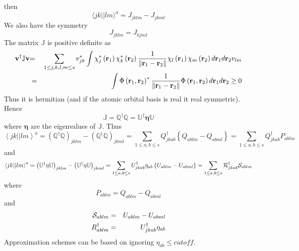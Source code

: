 \documentclass[aps,preprint]{revtex4}
\begin{document}
then 
\begin{equation}
\langle jk||lm\rangle ^{a}=J_{jklm}-J_{jkml}
\end{equation}%
We also have the symmetry 
\begin{equation}
J_{jklm}=J_{kjml}
\end{equation}%
The matrix $\mathbb{J}$ is positive definite as 
\begin{eqnarray}
\mathbf{v}^{\dagger }\mathbb{J}\mathbf{v} &\mathbf{=}&\sum_{1\leq
j,k,l,m\leq s}v_{jk}^{\ast }\int \chi _{j}^{\ast }\left( \mathbf{r}%
_{1}\right) \chi _{k}^{\ast }\left( \mathbf{r}_{2}\right) \frac{1}{\left\| 
\mathbf{r}_{1}-\mathbf{r}_{2}\right\| }\chi _{l}\left( \mathbf{r}_{1}\right)
\chi _{m}\left( \mathbf{r}_{2}\right) d\mathbf{r}_{1}d\mathbf{r}_{2}v_{lm} 
\notag \\
&=&\int \Phi \left( \mathbf{r}_{1},\mathbf{r}_{2}\right) ^{\ast }\frac{1}{%
\left\| \mathbf{r}_{1}-\mathbf{r}_{2}\right\| }\Phi \left( \mathbf{r}_{1},%
\mathbf{r}_{2}\right) d\mathbf{r}_{1}d\mathbf{r}_{2}\geq 0
\end{eqnarray}%
Thus it is hermitian (and if the atomic orbital basis is real it real
symmetric). Hence 
\begin{equation}
\mathbb{J=Q}^{\dagger }\mathbb{Q=U}^{\dagger }\mathbf{\eta }\mathbb{U}
\end{equation}%
where $\mathbf{\eta }$ are the eigenvalues of $\mathbb{J}$. Thus 
\begin{equation}
\left\langle jk||lm\right\rangle ^{a}=\left( \mathbb{Q}^{\dagger }\mathbb{Q}%
\right) _{jklm}-\left( \mathbb{Q}^{\dagger }\mathbb{Q}\right)
_{jkml}=\sum_{1\leq a,b\leq s}Q_{jkab}^{\dagger }\left\{
Q_{ablm}-Q_{abml}\right\} =\sum_{1\leq a,b\leq s}Q_{jkab}^{\dagger }P_{ablm}
\end{equation}%
and 
\begin{equation}
\left\langle jk||lm\right\rangle ^{a}=\left( \mathbb{U}^{\dagger }\mathbf{%
\eta }\mathbb{U}\right) _{jklm}-\left( \mathbb{U}^{\dagger }\mathbf{\eta }%
\mathbb{U}\right) _{jkml}=\sum_{1\leq a,b\leq s}U_{jkab}^{\dagger }\eta
_{ab}\left\{ U_{ablm}-U_{abml}\right\} =\sum_{1\leq a,b\leq s}\mathcal{R}%
_{jkab}^{\dagger }\mathcal{S}_{ablm}
\end{equation}%
where 
\begin{equation}
P_{ablm}=Q_{ablm}-Q_{abml}
\end{equation}%
and 
\begin{eqnarray}
\mathcal{S}_{ablm} &=&U_{ablm}-U_{abml}  \notag \\
R_{ablm}^{\dagger } &=&U_{jkab}^{\dagger }\eta _{ab}
\end{eqnarray}%
Approximation schemes can be based on ignoring $\eta _{ab}\leq cutoff$. 
\end{document}
